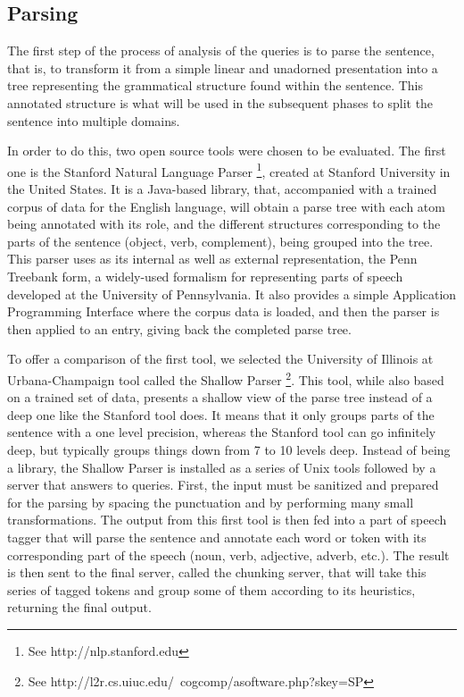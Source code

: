 \subsection{Parsing} %
\label{sub:parsing}

The first step of the process of analysis of the queries is to parse the sentence, that is, to transform it from a simple linear and unadorned presentation into a tree representing the grammatical structure found within the sentence. This annotated structure is what will be used in the subsequent phases to split the sentence into multiple domains.

In order to do this, two open source tools were chosen to be evaluated. The first one is the Stanford Natural Language Parser \footnote{See http://nlp.stanford.edu}, created at Stanford University in the United States. It is a Java-based library, that, accompanied with a trained corpus of data for the English language, will obtain a parse tree with each atom being annotated with its role, and the different structures corresponding to the parts of the sentence (object, verb, complement), being grouped into the tree. This parser uses as its internal as well as external representation, the Penn Treebank form, a widely-used formalism for representing parts of speech developed at the University of Pennsylvania. It also provides a simple Application Programming Interface where the corpus data is loaded, and then the parser is then applied to an entry, giving back the completed parse tree.

To offer a comparison of the first tool, we selected the University of Illinois at Urbana-Champaign tool called the Shallow Parser \footnote{See http://l2r.cs.uiuc.edu/~cogcomp/asoftware.php?skey=SP}. This tool, while also based on a trained set of data, presents a shallow view of the parse tree instead of a deep one like the Stanford tool does. It means that it only groups parts of the sentence with a one level precision, whereas the Stanford tool can go infinitely deep, but typically groups things down from 7 to 10 levels deep. Instead of being a library, the Shallow Parser is installed as a series of Unix tools followed by a server that answers to queries. First, the input must be sanitized and prepared for the parsing by spacing the punctuation and by performing many small transformations. The output from this first tool is then fed into a part of speech tagger that will parse the sentence and annotate each word or token with its corresponding part of the speech (noun, verb, adjective, adverb, etc.). The result is then sent to the final server, called the chunking server, that will take this series of tagged tokens and group some of them according to its heuristics, returning the final output.

